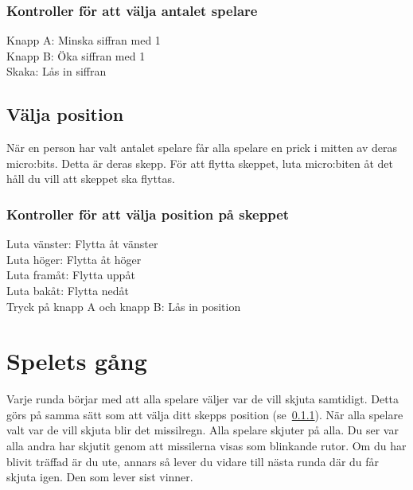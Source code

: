 \documentclass[a4paper, 12pt]{article}
\begin{document}
    \subsubsection{Kontroller för att välja antalet spelare}
    \noindent
    Knapp A\@: Minska siffran med 1 \\
    Knapp B\@: Öka siffran med 1 \\
    Skaka: Lås in siffran \\

    \subsection{Välja position}
    \noindent
    När en person har valt antalet spelare får alla spelare en prick i mitten av deras micro:bits.
    Detta är deras skepp. För att flytta skeppet,
    luta micro:biten åt det håll du vill att skeppet ska flyttas.

    \subsubsection{Kontroller för att välja position på skeppet}\label{sec:positions-kontroller}
    \noindent
    Luta vänster: Flytta åt vänster \\
    Luta höger: Flytta åt höger \\
    Luta framåt: Flytta uppåt \\
    Luta bakåt: Flytta nedåt \\
    Tryck på knapp A och knapp B\@: Lås in position \\

    \newpage
    \section{Spelets gång}
    Varje runda börjar med att alla spelare väljer var de vill skjuta samtidigt.
    Detta görs på samma sätt som att välja ditt skepps position (se~\ref{sec:positions-kontroller}).
    När alla spelare valt var de vill skjuta blir det missilregn.
    Alla spelare skjuter på alla.
    Du ser var alla andra har skjutit genom att missilerna visas som blinkande rutor.
    Om du har blivit träffad är du ute, annars så lever du vidare till nästa runda där du får skjuta igen.
    Den som lever sist vinner.
\end{document}
